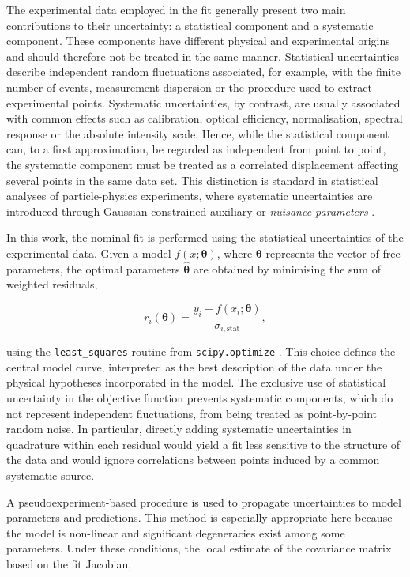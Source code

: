 \documentclass[12pt,a4paper]{article}
\begin{document}
The experimental data employed in the fit generally present two main contributions to their uncertainty: a statistical component and a systematic component. These components have different physical and experimental origins and should therefore not be treated in the same manner. Statistical uncertainties describe independent random fluctuations associated, for example, with the finite number of events, measurement dispersion or the procedure used to extract experimental points. Systematic uncertainties, by contrast, are usually associated with common effects such as calibration, optical efficiency, normalisation, spectral response or the absolute intensity scale. Hence, while the statistical component can, to a first approximation, be regarded as independent from point to point, the systematic component must be treated as a correlated displacement affecting several points in the same data set. This distinction is standard in statistical analyses of particle-physics experiments, where systematic uncertainties are introduced through Gaussian-constrained auxiliary or \textit{nuisance parameters} \cite{Barlow2002,Cowan2011,Conway2011,Cranmer2012HistFactory,PDGStatistics2024}.

In this work, the nominal fit is performed using the statistical uncertainties of the experimental data. Given a model $f(x;\boldsymbol{\theta})$, where $\boldsymbol{\theta}$ represents the vector of free parameters, the optimal parameters $\hat{\boldsymbol{\theta}}$ are obtained by minimising the sum of weighted residuals,

\begin{equation*}
r_i(\boldsymbol{\theta})=
\frac{y_i-f(x_i;\boldsymbol{\theta})}
{\sigma_{i,\mathrm{stat}}},
\end{equation*}

using the \texttt{least\_squares} routine from \texttt{scipy.optimize} \cite{Virtanen2020SciPy}. This choice defines the central model curve, interpreted as the best description of the data under the physical hypotheses incorporated in the model. The exclusive use of statistical uncertainty in the objective function prevents systematic components, which do not represent independent fluctuations, from being treated as point-by-point random noise. In particular, directly adding systematic uncertainties in quadrature within each residual would yield a fit less sensitive to the structure of the data and would ignore correlations between points induced by a common systematic source.

A pseudoexperiment-based procedure is used to propagate uncertainties to model parameters and predictions. This method is especially appropriate here because the model is non-linear and significant degeneracies exist among some parameters. Under these conditions, the local estimate of the covariance matrix based on the fit Jacobian,
\end{document}
